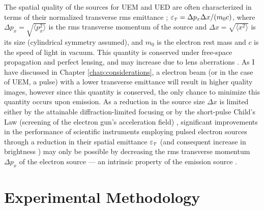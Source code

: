 

The spatial quality of the sources for UEM and UED are often characterized in terms of their normalized transverse rms emittance \cite{dowell_quantum_2009,jensen_emittance_2010}; $\varepsilon_{{\scriptscriptstyle T}} = \Delta p_x \Delta x / (m_0 c)$, where $\Delta p_x = \sqrt{ \langle p_x^2 \rangle }$ is the rms transverse momentum of the source and $\Delta x = \sqrt{ \langle x^2 \rangle }$  is its size (cylindrical symmetry assumed), and $m_0$ is the electron rest mass and $c$ is the speed of light in vacuum.
This quantity is conserved under free-space propagation and perfect lensing, and may increase due to lens aberrations \cite{oshea_reversible_1998}.
As I have discussed in Chapter \ref{chap:considerations}, a electron beam (or in the case of UEM, a pulse) with a lower transverse emittance will result in higher quality images, however since this quantity is conserved, the only chance to minimize this quantity occurs upon emission.
As a reduction in the source size $\Delta x$ is limited either by the attainable diffraction-limited focusing or by the short-pulse Child's Law (screening of the electron gun's acceleration field) \cite{valfells_effects_2002}, significant improvements in the performance of scientific instruments employing pulsed electron sources through a reduction in their spatial emittance $\varepsilon_{{\scriptscriptstyle T}}$ (and consequent increase in brightness \cite{berger_dc_2009}) may only be possible by decreasing the rms transverse momentum $\Delta p_x$ of the electron source --- an intrinsic property of the emission source \cite{dowell_quantum_2009,jensen_emittance_2010}.  

\section{Experimental Methodology} \label{sec:photocathode-method}

